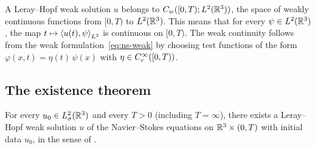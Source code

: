 \begin{remark}\label{rem:time-regularity}
  A Leray--Hopf weak solution $u$ belongs to $C_{w}([0, T); L^{2}(\mathbb{R}^{3}))$, the
  space of weakly continuous functions from $[0, T)$ to $L^{2}(\mathbb{R}^{3})$.  This means
  that for every $\psi \in L^{2}(\mathbb{R}^{3})$, the map $t \mapsto \left\langle u(t), \psi \right\rangle_{L^{2}}$
  is continuous on $[0, T)$.  The weak continuity follows from the weak
  formulation~\eqref{eq:ns-weak} by choosing test functions of the form
  $\varphi(x, t) = \eta(t)\,\psi(x)$ with $\eta \in C^\infty_c([0, T))$.
\end{remark}

\subsection{The existence theorem}

\begin{theorem}%
  \label{thm:leray-hopf-existence}
  For every $u_{0} \in L^{2}_\sigma(\mathbb{R}^{3})$ and every $T > 0$ (including $T = \infty$), there
  exists a Leray--Hopf weak solution $u$ of the Navier--Stokes equations on
  $\mathbb{R}^{3} \times (0, T)$ with initial data $u_{0}$, in the sense of
  .
\end{theorem}

